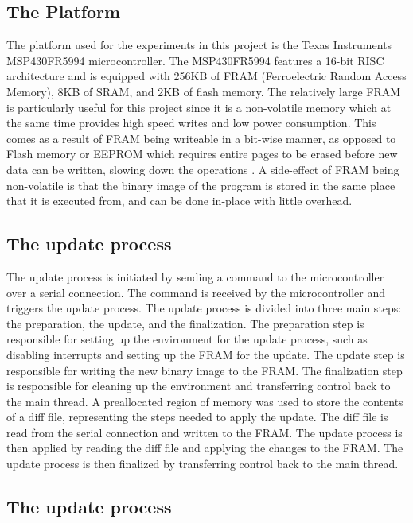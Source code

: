\subsection{The Platform}
The platform used for the experiments in this project is the Texas Instruments MSP430FR5994 microcontroller. The MSP430FR5994 features a 16-bit RISC architecture and is equipped with 256KB of FRAM (Ferroelectric Random Access Memory), 8KB of SRAM, and 2KB of flash memory. The relatively large FRAM is particularly useful for this project since it is a non-volatile memory which at the same time provides high speed writes and low power consumption. This comes as a result of FRAM being writeable in a bit-wise manner, as opposed to Flash memory or EEPROM which requires entire pages to be erased before new data can be written, slowing down the operations \cite{framReport}. A side-effect of FRAM being non-volatile is that the binary image of the program is stored in the same place that it is executed from, and can be done in-place with little overhead. 

\subsection{The update process}
The update process is initiated by sending a command to the microcontroller over a serial connection. The command is received by the microcontroller and triggers the update process. The update process is divided into three main steps: the preparation, the update, and the finalization. The preparation step is responsible for setting up the environment for the update process, such as disabling interrupts and setting up the FRAM for the update. The update step is responsible for writing the new binary image to the FRAM. The finalization step is responsible for cleaning up the environment and transferring control back to the main thread.
A preallocated region of memory was used to store the contents of a diff file, representing the steps needed to apply the update. The diff file is read from the serial connection and written to the FRAM. The update process is then applied by reading the diff file and applying the changes to the FRAM. The update process is then finalized by transferring control back to the main thread. 

\subsection{The update process}
